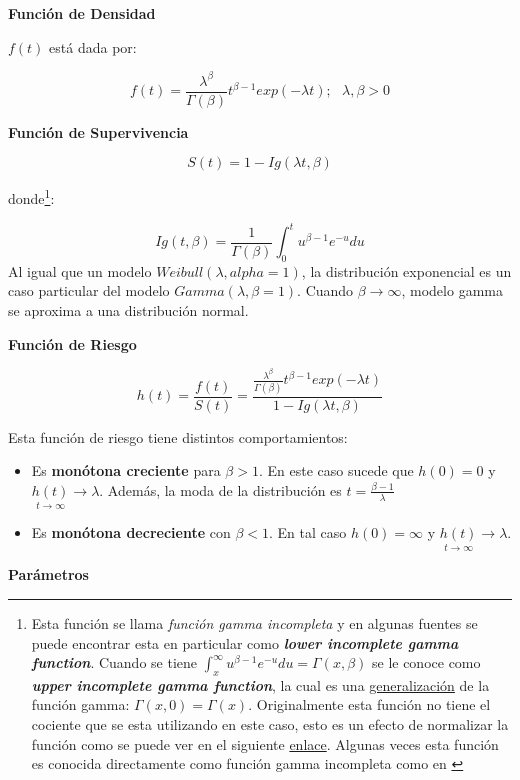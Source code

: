 \documentclass[
  a4paper,
  oneside,
  openany]{book}
\providecommand{\tightlist}{%
  \setlength{\itemsep}{0pt}\setlength{\parskip}{0pt}}
\begin{document}
\textbf{Función de Densidad}

\(f(t)\) está dada por:

\[
f(t)=\frac{\lambda^\beta}{\Gamma(\beta)}t^{\beta-1}exp(-\lambda t); \ \ \  \lambda,\beta>0
\]

\textbf{Función de Supervivencia}

\[
S(t)=1-Ig(\lambda t, \beta)
\]

donde\footnote{Esta función se llama \emph{función gamma incompleta} y en algunas fuentes se puede encontrar esta en particular como \emph{\textbf{lower incomplete gamma function}}. Cuando se tiene \(\int_x^{\infty}u^{\beta-1}e^{-u}du = \Gamma(x, \beta)\) se le conoce como \emph{\textbf{upper incomplete gamma function}}, la cual es una \href{https://mathworld.wolfram.com/IncompleteGammaFunction.html}{generalización} de la función gamma: \(\Gamma(x, 0) = \Gamma(x)\). Originalmente esta función no tiene el cociente que se esta utilizando en este caso, esto es un efecto de normalizar la función como se puede ver en el siguiente \href{https://dlmf.nist.gov/8.2}{enlace}. Algunas veces esta función es conocida directamente como función gamma incompleta como en \citep{klein2006survival}}:

\[
Ig(t,\beta)=\frac{1}{\Gamma(\beta)}\int_0^{t}u^{\beta-1}e^{-u}du
\]
Al igual que un modelo \(Weibull(\lambda, alpha = 1)\), la distribución exponencial es un caso particular del modelo \(Gamma(\lambda,\beta = 1)\). Cuando \(\beta \rightarrow\infty\), modelo gamma se aproxima a una distribución normal.

\textbf{Función de Riesgo}

\[
h(t)=\frac{f(t)}{S(t)}=\frac{\frac{\lambda^\beta}{\Gamma(\beta)}t^{\beta-1}exp(-\lambda t)}{1-Ig(\lambda t, \beta)}
\]

Esta función de riesgo tiene distintos comportamientos:

\begin{itemize}
\tightlist
\item
  Es \textbf{monótona creciente} para \(\beta>1\). En este caso sucede que \(h(0)=0\) y \(\underset{t\rightarrow\infty}{h(t)} \rightarrow \lambda\). Además, la moda de la distribución es \(t = \frac{\beta-1}{\lambda}\)
\item
  Es \textbf{monótona decreciente} con \(\beta <1\). En tal caso \(h(0) = \infty\) y \(\underset{t\rightarrow\infty}{h(t)} \rightarrow \lambda\).
\end{itemize}

\textbf{Parámetros}
\end{document}
